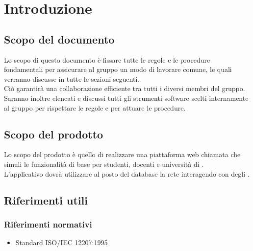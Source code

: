 \documentclass[NormeDiProgetto.tex]{subfiles}
\begin{document}
\chapter{Introduzione}

\section{Scopo del documento}
Lo scopo di questo documento è fissare tutte le regole e le procedure fondamentali per assicurare al gruppo un modo di lavorare comune, le quali verranno discusse in tutte le sezioni seguenti.\\
Ciò garantirà una collaborazione efficiente tra tutti i diversi membri del gruppo.\\
Saranno inoltre elencati e discussi tutti gli strumenti software scelti internamente al gruppo per rispettare le regole e per attuare le procedure.

\section{Scopo del prodotto}
Lo scopo del prodotto è quello di realizzare una piattaforma web chiamata \progetto che simuli le funzionalità di base per studenti, docenti e università di .\\
L'applicativo dovrà utilizzare al posto del database la rete  interagendo con degli .

\glossExpl

\section{Riferimenti utili}
\subsection{Riferimenti normativi}
\begin{itemize}
	\item Standard ISO/IEC 12207:1995\\ 
\end{itemize}
\end{document}
